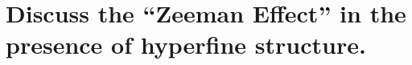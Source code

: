 \section{Discuss the “Zeeman Effect” in the presence of hyperfine structure.}

\noindent
\Large

\normalsize